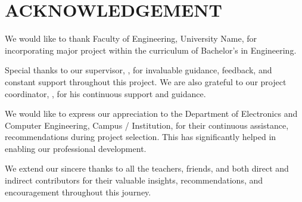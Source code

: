 \chapter*{ACKNOWLEDGEMENT}
{}

We would like to thank Faculty of Engineering, University Name, for
incorporating  major project within the curriculum of Bachelor’s in Engineering.

Special thanks to our supervisor, \textbf{\cSupervisor}, for invaluable guidance, feedback, and constant support throughout this project.
We are also grateful to our project coordinator, \textbf{\cProjectCoordinator}, for his continuous support and guidance.

We would like to express our appreciation to the Department of Electronics and
Computer Engineering, Campus / Institution, for their continuous assistance,
recommendations during project selection. This has significantly helped in enabling our professional development.


We extend our sincere thanks to all the teachers, friends, and both direct and indirect contributors for their valuable insights, recommendations, and encouragement throughout this journey.

\vspace{1em}
\noindent \authorTable